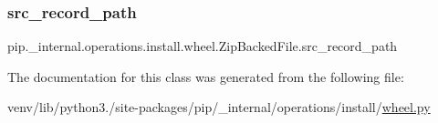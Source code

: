 \subsubsection{\texorpdfstring{src\+\_\+record\+\_\+path}{src\_record\_path}}
{\footnotesize\ttfamily pip.\+\_\+internal.\+operations.\+install.\+wheel.\+Zip\+Backed\+File.\+src\+\_\+record\+\_\+path}



The documentation for this class was generated from the following file\+:\begin{DoxyCompactItemize}
\item 
venv/lib/python3./site-\/packages/pip/\+\_\+internal/operations/install/\hyperlink{pip_2__internal_2operations_2install_2wheel_8py}{wheel.\+py}\end{DoxyCompactItemize}
